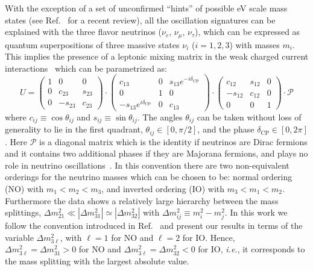 \documentclass[a4paper, 11pt]{article}
\newcommand{\Dmq}{\Delta m^2}
\begin{document}
With the exception of a set of unconfirmed ``hints'' of possible eV
scale mass states (see Ref.~\cite{Giunti:2015wnd} for a recent
review), all the oscillation signatures can be explained with the
three flavor neutrinos ($\nu_e$, $\nu_\mu$, $\nu_\tau$), which can be
expressed as quantum superpositions of three massive states $\nu_i$
($i=1,2,3$) with masses $m_i$.  This implies the presence of a
leptonic mixing matrix in the weak charged current
interactions~\cite{Maki:1962mu, Kobayashi:1973fv} which can be
parametrized as:
%
\begin{equation}
  \label{eq:U3m}
  U =
  \begin{pmatrix}
    1 & 0 & 0 \\
    0 & c_{23}  & {s_{23}} \\
    0 & -s_{23} & {c_{23}}
  \end{pmatrix}
  \cdot
  \begin{pmatrix}
    c_{13} & 0 & s_{13} e^{-i\delta_\text{CP}} \\
    0 & 1 & 0 \\
    -s_{13} e^{i\delta_\text{CP}} & 0 & c_{13}
  \end{pmatrix}
  \cdot
  \begin{pmatrix}
    c_{12} & s_{12} & 0 \\
    -s_{12} & c_{12} & 0 \\
    0 & 0 & 1
  \end{pmatrix}
  \cdot \mathcal{P}
\end{equation}
%
where $c_{ij} \equiv \cos\theta_{ij}$ and $s_{ij} \equiv
\sin\theta_{ij}$.  The angles $\theta_{ij}$ can be taken without loss
of generality to lie in the first quadrant, $\theta_{ij} \in [0,
  \pi/2]$, and the phase $\delta_\text{CP} \in [0, 2\pi]$.  Here
$\mathcal{P}$ is a diagonal matrix which is the identity if neutrinos
are Dirac fermions and it contains two additional phases if they are
Majorana fermions, and plays no role in neutrino
oscillations~\cite{Bilenky:1980cx, Langacker:1986jv}.
%
In this convention there are two non-equivalent orderings for the
neutrino masses which can be chosen to be: normal ordering (NO) with
$m_1 < m_2 < m_3$, and inverted ordering (IO) with $m_3 < m_1 <
m_2$. Furthermore the data shows a relatively large hierarchy between
the mass splittings, $\Dmq_{21} \ll |\Dmq_{31}| \simeq |\Dmq_{32}|$
with $\Dmq_{ij} \equiv m_i^2 - m_j^2$.  In this work we follow the
convention introduced in Ref.~\cite{Gonzalez-Garcia:2014bfa} and
present our results in terms of the variable $\Dmq_{3\ell}$, with
$\ell=1$ for NO and $\ell=2$ for IO.  Hence, $\Dmq_{3\ell} = \Dmq_{31}
> 0$ for NO and $\Dmq_{3\ell} = \Dmq_{32} < 0$ for IO, \textit{i.e.},
it corresponds to the mass splitting with the largest absolute value.
\end{document}
